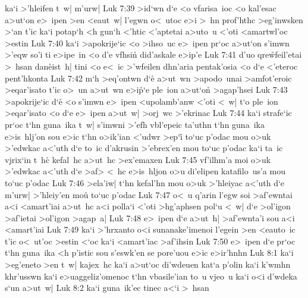 ka`i
>'hleifen
t~w|
m'urw|\bibvsend
\vs Luk 7:39
>id`wn
d`e
<o
vfarisa~ioc
<o
kal'esac
a>ut`on
e>~ipen
>en
<eaut~w|
l'egwn
o<~utoc
e>i
>~hn
prof'hthc
>eg'inwsken
>`an
t'ic
ka`i
potap`h
<h
gun`h
<'htic
<'aptetai
a>uto~u
<'oti
<amartwl'oc
>estin\bibvsend
\vs Luk 7:40
ka`i
>apokrije`ic
<o
>ihso~uc
e>~ipen
pr`oc
a>ut`on
s'imwn
>'eqw
so'i
ti
e>ipe~in
<o
d'e
vfhsin\r{}
did'askale
e>ip'e\bibvsend
\vs Luk 7:41
d'uo
qre\r{w}feil'etai
>~hsan
dan\r{e}ist~h|
tini
<o
e<~ic
>'wfeilen
dhn'aria
pentak'osia
<o
d`e
<'eteroc
pent'hkonta\bibvsend
\vs Luk 7:42
m`h
>eq'ontwn
d`e\r{}
a>ut~wn
>apodo~unai
>amfot'eroic
>eqar'isato
t'ic
o>~un
a>ut~wn
e>i\r{p}`e
ple~ion
a>ut`on\r{}
>agap'hsei\bibvsend
\vs Luk 7:43
>apokrije`ic
d`e\r{}
<o
s'imwn
e>~ipen
<upolamb'anw
<'oti
<~w|
t`o
ple~ion
>eqar'isato
<o
d`e
e>~ipen
a>ut~w|
>orj~wc
>'ekrinac\bibvsend
\vs Luk 7:44
ka`i
strafe`ic
pr`oc
t`hn
guna~ika
t~w|
s'imwni
>'efh
vbl'epeic
ta'uthn
t`hn
guna~ika
e>is~hlj'on
sou
e>ic
t`hn
o>ik'ian
<'udwr
>ep`i\r{}
to`uc
p'odac
mou
o>uk
>'edwkac
a<'uth
d`e
to~ic
d'akrusin
>'ebrex'en
mou
to`uc
p'odac
ka`i
ta~ic
vjrix`in
t~hc\r{}
kefal~hc
a>ut~hc
>ex'emaxen\bibvsend
\vs Luk 7:45
vf'ilhm'a
moi
o>uk
>'edwkac
a<'uth
d`e
>af>
<~hc
e>is~hljon
o>u
di'elipen
katafilo~us'a
mou
to`uc
p'odac\bibvsend
\vs Luk 7:46
>ela'iw|
t`hn
kefal'hn
mou
o>uk
>'hleiyac
a<'uth
d`e
m'urw|
>'hleiy'en
mou\r{}
to`uc
p'odac\bibvsend
\vs Luk 7:47
o<~u
q'arin
l'egw
soi
>af'ewntai
a<i
<amart'iai
a>ut~hc
a<i
polla`i
<'oti
>hg'aphsen
pol`u
<~w|
d`e
>ol'igon
>af'ietai
>ol'igon
>agap~a|\bibvsend
\vs Luk 7:48
e>~ipen
d`e
a>ut~h|
>af'ewnta'i
sou
a<i
<amart'iai\bibvsend
\vs Luk 7:49
ka`i
>'hrxanto
o<i
sunanake'imenoi
l'egein
>en
<eauto~ic
t'ic
o<~ut'oc
>estin
<`oc
ka`i
<amart'iac
>af'ihsin\bibvsend
\vs Luk 7:50
e>~ipen
d`e
pr`oc
t`hn
guna~ika
<h
p'istic
sou
s'eswk'en
se
pore'uou
e>ic
e>ir'hnhn\bibvsend
\vs Luk 8:1
ka`i
>eg'eneto
>en
t~w|
kajex~hc
ka`i
a>ut`oc
di'wdeuen
kat`a
p'olin
ka`i
k'wmhn
khr'usswn
ka`i
e>uaggeliz'omenoc
t`hn
vbasile'ian
to~u
vjeo~u
ka`i
o<i
d'wdeka
s`un
a>ut~w|\bibvsend
\vs Luk 8:2
ka`i
guna~ik'ec
tinec
a<`i
>~hsan
